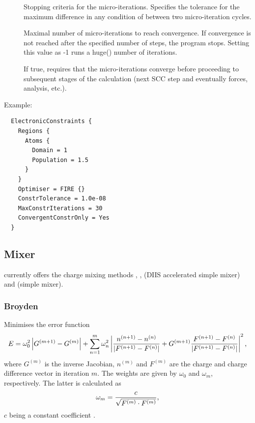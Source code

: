 \begin{description}
\item[] Stopping criteria for the micro-iterations.
  Specifies the tolerance for the maximum difference in any condition of
   between two micro-iteration cycles.

\item[] Maximal number of micro-iterations to reach
  convergence. If convergence is not reached after the specified
  number of steps, the program stops. Setting this value as -1 runs a
  huge() number of iterations.

\item[] If true, requires that the micro-iterations
  converge before proceeding to subsequent stages of the calculation (next SCC
  step and eventually forces, analysis, etc.).
\end{description}

Example:
\begin{verbatim}
  ElectronicConstraints {
    Regions {
      Atoms {
        Domain = 1
        Population = 1.5
      }
    }
    Optimiser = FIRE {}
    ConstrTolerance = 1.0e-08
    MaxConstrIterations = 30
    ConvergentConstrOnly = Yes
  }
\end{verbatim}


\subsection{Mixer}
\label{sec:dftbp.Mixer}

{\dftbp} currently offers the charge mixing methods ,
,  (DIIS accel\-er\-ated simple mixer) and
 (simple mixer).

\subsubsection{Broyden\cb}
\label{sec:dftbp.Broyden}

Minimises the error function
\begin{equation*}
  E = \omega_0^2 \left| G^{(m+1)} - G^{(m)}\right| + \sum_{n=1}^m
  \omega_n^2 \left|
    \frac{n^{(n+1)} - n^{(n)}}{|F^{(n+1)}  - F^{(n)}|}
    + G^{(m+1)}
    \frac{F^{(n+1)}  - F^{(n)}}{|F^{(n+1)}  - F^{(n)}|} \right|^2
  \text,
\end{equation*}
where $G^{(m)}$ is the inverse Jacobian, $n^{(m)}$ and $F^{(m)}$ are
the charge and charge difference vector in iteration $m$. The weights
are given by $\omega_0$ and $\omega_m$, respectively. The latter is
calculated as
\begin{equation}
  \label{eq:omega_m}
  \omega_m = \frac{c}{\sqrt{F^{(m)}\cdot F^{(m)}}}
  \text,
\end{equation}
$c$ being a constant coefficient \cite{johnson-PRB-38-12807}.

